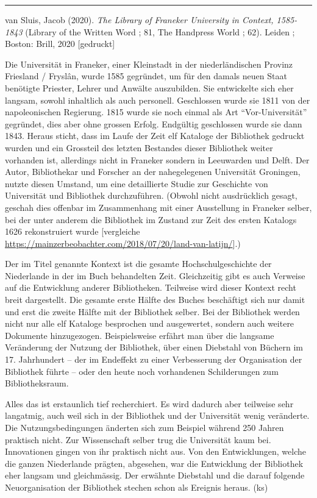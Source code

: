 \documentclass[a4paper,
fontsize=11pt,
oneside,
numbers=noperiodatend,
parskip=half-,
bibliography=totoc,
final
]{scrartcl}
\begin{document}
\begin{center}\rule{0.5\linewidth}{0.5pt}\end{center}

van Sluis, Jacob (2020). \emph{The Library of Franeker University in
Context, 1585-1843} (Library of the Written Word ; 81, The Handpress
World ; 62). Leiden ; Boston: Brill, 2020 {[}gedruckt{]}

Die Universität in Franeker, einer Kleinstadt in der niederländischen
Provinz Friesland / Fryslân, wurde 1585 gegründet, um für den damals
neuen Staat benötigte Priester, Lehrer und Anwälte auszubilden. Sie
entwickelte sich eher langsam, sowohl inhaltlich als auch personell.
Geschlossen wurde sie 1811 von der napoleonischen Regierung. 1815 wurde
sie noch einmal als Art \enquote{Vor-Universität} gegründet, dies aber
ohne grossen Erfolg. Endgültig geschlossen wurde sie dann 1843. Heraus
sticht, dass im Laufe der Zeit elf Kataloge der Bibliothek gedruckt
wurden und ein Grossteil des letzten Bestandes dieser Bibliothek weiter
vorhanden ist, allerdings nicht in Franeker sondern in Leeuwarden und
Delft. Der Autor, Bibliothekar und Forscher an der nahegelegenen
Universität Groningen, nutzte diesen Umstand, um eine detaillierte
Studie zur Geschichte von Universität und Bibliothek durchzuführen.
(Obwohl nicht ausdrücklich gesagt, geschah dies offenbar im Zusammenhang
mit einer Ausstellung in Franeker selber, bei der unter anderem die
Bibliothek im Zustand zur Zeit des ersten Katalogs 1626 rekonstruiert
wurde {[}vergleiche
\url{https://mainzerbeobachter.com/2018/07/20/land-van-latijn/}{]}.)

Der im Titel genannte Kontext ist die gesamte Hochschulgeschichte der
Niederlande in der im Buch behandelten Zeit. Gleichzeitig gibt es auch
Verweise auf die Entwicklung anderer Bibliotheken. Teilweise wird dieser
Kontext recht breit dargestellt. Die gesamte erste Hälfte des Buches
beschäftigt sich nur damit und erst die zweite Hälfte mit der Bibliothek
selber. Bei der Bibliothek werden nicht nur alle elf Kataloge besprochen
und ausgewertet, sondern auch weitere Dokumente hinzugezogen.
Beispielsweise erfährt man über die langsame Veränderung der Nutzung der
Bibliothek, über einen Diebstahl von Büchern im 17. Jahrhundert -- der
im Endeffekt zu einer Verbesserung der Organisation der Bibliothek
führte -- oder den heute noch vorhandenen Schilderungen zum
Bibliotheksraum.

Alles das ist erstaunlich tief recherchiert. Es wird dadurch aber
teilweise sehr langatmig, auch weil sich in der Bibliothek und der
Universität wenig veränderte. Die Nutzungsbedingungen änderten sich zum
Beispiel während 250 Jahren praktisch nicht. Zur Wissenschaft selber
trug die Universität kaum bei. Innovationen gingen von ihr praktisch
nicht aus. Von den Entwicklungen, welche die ganzen Niederlande prägten,
abgesehen, war die Entwicklung der Bibliothek eher langsam und
gleichmässig. Der erwähnte Diebstahl und die darauf folgende
Neuorganisation der Bibliothek stechen schon als Ereignis heraus. (ks)
\end{document}

